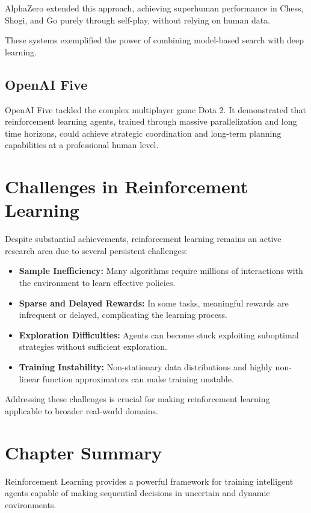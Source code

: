 \documentclass[openany]{book}
\begin{document}
AlphaZero extended this approach, achieving superhuman performance in Chess, 
Shogi, and Go purely through self-play, without relying on human data.

These systems exemplified the power of combining model-based search with deep 
learning.

\subsection{OpenAI Five}

OpenAI Five tackled the complex multiplayer game Dota 2. It demonstrated that 
reinforcement learning agents, trained through massive parallelization and long 
time horizons, could achieve strategic coordination and long-term planning 
capabilities at a professional human level.

\section{Challenges in Reinforcement Learning}

Despite substantial achievements, reinforcement learning remains an active 
research area due to several persistent challenges:

\begin{itemize}
    \item \textbf{Sample Inefficiency:} Many algorithms require millions of 
    interactions with the environment to learn effective policies.
    \item \textbf{Sparse and Delayed Rewards:} In some tasks, meaningful rewards 
    are infrequent or delayed, complicating the learning process.
    \item \textbf{Exploration Difficulties:} Agents can become stuck exploiting 
    suboptimal strategies without sufficient exploration.
    \item \textbf{Training Instability:} Non-stationary data distributions and 
    highly non-linear function approximators can make training unstable.
\end{itemize}

Addressing these challenges is crucial for making reinforcement learning 
applicable to broader real-world domains.

\section{Chapter Summary}

Reinforcement Learning provides a powerful framework for training intelligent 
agents capable of making sequential decisions in uncertain and dynamic 
environments.
\end{document}
